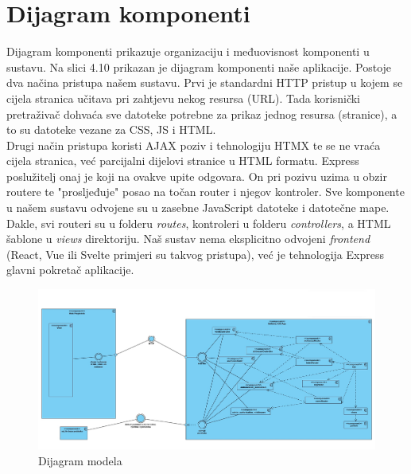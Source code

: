 			\eject
		\section{Dijagram komponenti}
		
        Dijagram komponenti prikazuje organizaciju i međuovisnost komponenti u sustavu. Na slici 4.10 prikazan je dijagram komponenti naše aplikacije. 
        Postoje dva načina pristupa našem sustavu. Prvi je standardni HTTP pristup u kojem se cijela stranica učitava pri zahtjevu nekog resursa (URL). Tada korisnički pretraživač dohvaća sve datoteke potrebne za prikaz jednog resursa (stranice), a to su datoteke vezane za CSS, JS i HTML.
        \newline
        \\
        Drugi način pristupa koristi AJAX poziv i tehnologiju HTMX te se ne vraća cijela stranica, već parcijalni dijelovi stranice u HTML formatu. Express poslužitelj onaj je koji na ovakve upite odgovara. On pri pozivu  uzima u obzir routere te "prosljeđuje" posao na točan router i njegov kontroler. Sve komponente u našem sustavu odvojene su u zasebne JavaScript datoteke i datotečne mape.
        \newline
        \\
        Dakle, svi routeri su u folderu \textit{routes}, kontroleri u folderu \textit{controllers}, a HTML šablone u \textit{views} direktoriju. Naš sustav nema eksplicitno odvojeni \textit{frontend} (React, Vue ili  Svelte primjeri su takvog pristupa), već je tehnologija Express glavni pokretač aplikacije.

        \begin{figure}[H]
            \includegraphics[width=1.1\textwidth]{dijagrami/DijagamKomponenti.jpg} 
            \centering
            \caption{Dijagram modela}
            \label{fig:class_diagram}
        \end{figure}	
            
            \eject
			